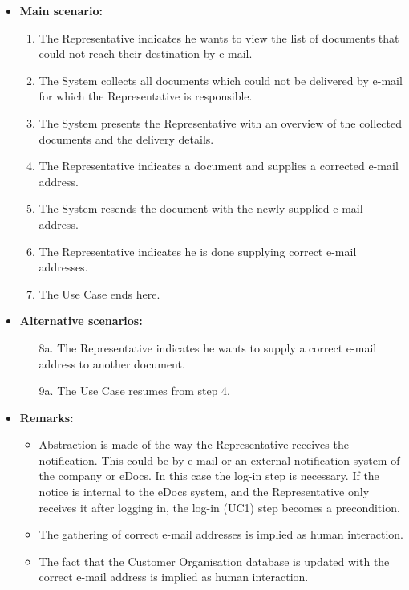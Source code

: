 \documentclass[a4paper,10pt]{article}
\begin{document}
\begin{itemize}
    \item \textbf{Main scenario:} 
    \begin{enumerate}
       \item The Representative indicates he wants to view the list of documents that could not reach their destination by e-mail.
       \item The System collects all documents which could not be delivered by e-mail for which the Representative is responsible.
       \item The System presents the Representative with an overview of the collected documents and the delivery details.
       \item The Representative indicates a document and supplies a corrected e-mail address.
       \item The System resends the document with the newly supplied e-mail address.
       \item The Representative indicates he is done supplying correct e-mail addresses.
       \item The Use Case ends here.
    \end{enumerate}

    \item \textbf{Alternative scenarios:} 
    \begin{enumerate}
        \item [8a.] The Representative indicates he wants to supply a correct e-mail address to another document.
        \item [9a.] The Use Case resumes from step 4.
    \end{enumerate}
    
    \item \textbf{Remarks:}
        \begin{itemize}
            \item Abstraction is made of the way the Representative receives the notification. This could be by e-mail or an external notification system of the company or eDocs. In this case the log-in step is necessary. If the notice is internal to the eDocs system, and the Representative only receives it after logging in, the log-in (UC1) step becomes a precondition.
            \item The gathering of correct e-mail addresses is implied as human interaction.
            \item The fact that the Customer Organisation database is updated with the correct e-mail address is implied as human interaction.
        \end{itemize}
\end{itemize}
\end{document}
